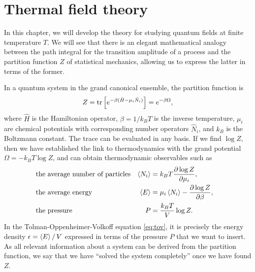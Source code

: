 \chapter{Thermal field theory}
\label{chap:tft}

\newcommand{\transampl}{\Braket{\phi_B | e^{- i \hat{H} T / \hbar} | \phi_A}}

In this chapter, we will develop the theory for studying quantum fields at finite temperature $T$.
We will see that there is an elegant mathematical analogy between the path integral for the transition amplitude of a process and the partition function $Z$ of statistical mechanics, allowing us to express the latter in terms of the former.

In a quantum system in the grand canonical ensemble, the partition function is \cite[equation 4.23]{ref:altland_simons}
\begin{equation}
	Z = \operatorname{tr} \left[ e^{-\beta (\hat{H} - \mu_i \hat{N}_i)} \right] = e^{-\beta \Omega} ,
\label{eq:tft:partition_function}
\end{equation}
where $\hat{H}$ is the Hamiltonian operator, $\beta = 1 / k_B T$ is the inverse temperature, $\mu_i$ are chemical potentials with corresponding number operators $\hat{N}_i$, and $k_B$ is the Boltzmann constant.
The trace can be evaluated in any basis.
If we find $\log Z$, then we have established the link to thermodynamics with the grand potential $\Omega = -k_B T \log{Z}$, and can obtain thermodynamic observables such as 
\cite[chapter 5]{ref:jensoluf}
\begin{subequations}
\begin{align}
	& \text{the average number of particles} & \Avg{N_i} & = k_B T \pdv{\log{Z}}{\mu_i},                    & \label{eq:tft:average_number} \\
	& \text{the average energy}              & \Avg{E}   & = \mu_i \Avg{N_i} - \pdv{\log{Z}}{\beta}, & \label{eq:tft:average_energy} \\ %
	& \text{the         pressure}            &             P    & = \frac{k_B T}{V} \log{Z}.                       & \label{eq:tft:average_pressure} %
\end{align}%
\label{eq:tft:average_quantities}%
\end{subequations}%
In the Tolman-Oppenheimer-Volkoff equation \eqref{eq:tov}, it is precisely the energy density $\epsilon = \left\langle E \right\rangle / \, V$ expressed in terms of the pressure $P$ that we want to insert.
As all relevant information about a system can be derived from the partition function, we say that we have ``solved the system completely'' once we have found $Z$.

